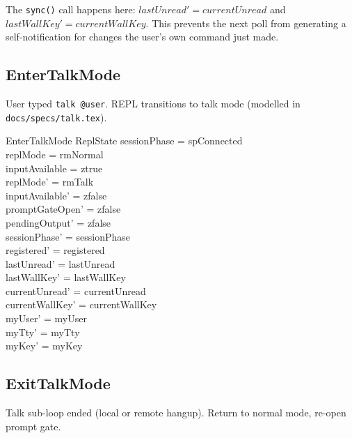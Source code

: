 \documentclass[a4paper,10pt,fleqn]{article}
\begin{document}
The \texttt{sync()} call happens here: $lastUnread' = currentUnread$
and $lastWallKey' = currentWallKey$.  This prevents the next poll
from generating a self-notification for changes the user's own
command just made.

\subsection{EnterTalkMode}

User typed \texttt{talk @user}.  REPL transitions to talk mode
(modelled in \texttt{docs/specs/talk.tex}).

\begin{schema}{EnterTalkMode}
  \Delta ReplState
\where
  sessionPhase = spConnected \\
  replMode = rmNormal \\
  inputAvailable = ztrue \\
  replMode' = rmTalk \\
  inputAvailable' = zfalse \\
  promptGateOpen' = zfalse \\
  pendingOutput' = zfalse \\
  sessionPhase' = sessionPhase \\
  registered' = registered \\
  lastUnread' = lastUnread \\
  lastWallKey' = lastWallKey \\
  currentUnread' = currentUnread \\
  currentWallKey' = currentWallKey \\
  myUser' = myUser \\
  myTty' = myTty \\
  myKey' = myKey
\end{schema}

\subsection{ExitTalkMode}

Talk sub-loop ended (local or remote hangup).  Return to normal
mode, re-open prompt gate.
\end{document}
